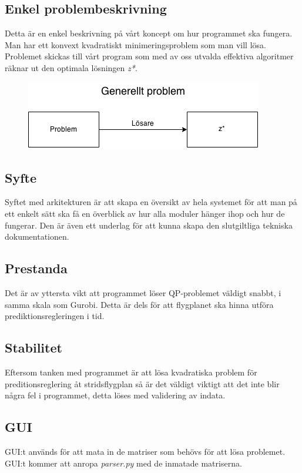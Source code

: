 \subsection{Enkel problembeskrivning}
Detta är en enkel beskrivning på vårt koncept om hur programmet ska fungera. Man har ett konvext kvadratiskt minimeringsproblem som man vill lösa. Problemet skickas till vårt program som med av oss utvalda effektiva algoritmer räknar ut den optimala lösningen \textit{z*}.

\begin{figure}[h]
	\begin{center}
		\includegraphics[scale=0.5]{bilder/generellt.png}
	\end{center}
\end{figure}

%

\subsection{Syfte}
Syftet med arkitekturen är att skapa en översikt av hela systemet för att man på ett enkelt sätt ska få en överblick av hur alla moduler hänger ihop och hur de fungerar. Den är även ett underlag för att kunna skapa den slutgiltliga tekniska dokumentationen.

\subsection{Prestanda}
Det är av yttersta vikt att programmet löser QP-problemet väldigt snabbt, i samma skala som Gurobi. Detta är dels för att flygplanet ska hinna utföra prediktionsregleringen i tid.

\subsection{Stabilitet}
Eftersom tanken med programmet är att lösa kvadratiska problem för preditionsreglering åt stridsflygplan så är det väldigt viktigt att det inte blir några fel i programmet, detta löses med validering av indata.

\subsection{GUI}
GUI:t används för att mata in de matriser som behövs för att lösa problemet. GUI:t kommer att anropa \textit{parser.py} med de inmatade matriserna.

